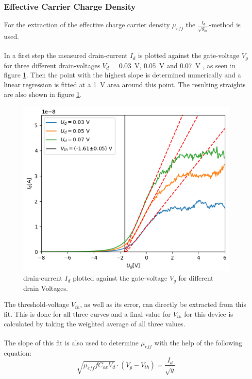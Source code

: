 \documentclass[%
 reprint,
amsmath,amssymb,
pra,
]{revtex4-1}
\begin{document}
\subsubsection{Effective Carrier Charge Density}
For the extraction of the effective charge carrier density $\mu_{eff}$ the $\frac{I_d}{\sqrt{g_m}}$-method is used.\\
\\
In a first step the measured drain-current $I_d$ is plotted against the gate-voltage $V_g$ for three different drain-voltages $V_d$ = \SI{0.03}{V}, \SI{0.05}{V} and \SI{0.07}{V} , as seen in figure \ref{fig:linreg1}. Then the point with the highest slope is determined numerically and a linear regression is fitted at a \SI{1}{\volt} area around this point. The resulting straights are also shown in figure \ref{fig:linreg1}.
\begin{figure}
\centering
\includegraphics[scale=0.6]{Bilder/linreg.png}
\caption{drain-current $I_d$ plotted against the gate-voltage $V_g$ for different drain Voltages.}
\label{fig:linreg1}
\end{figure}

The threshold-voltage $V_{th}$, as well as its error, can directly be extracted from this fit. This is done for all three curves and a final value for $V_{th}$ for this device is calculated by taking the weighted average of all three values.\\
\\
The slope of this fit is also used to determine $\mu_{eff}$ with the help of the following equation:
\begin{equation}
\sqrt{\mu_{eff} f C_{ox} V_d} \cdot (V_g-V_{th}) = \dfrac{I_d}{\sqrt{g}}
\end{equation}
\end{document}
